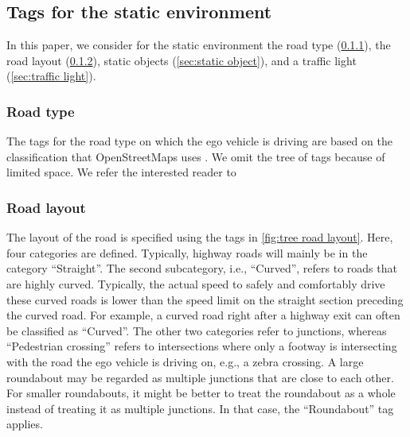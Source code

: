 \subsection{Tags for the static environment}
\label{sec:tags selection static}

In this paper, we consider for the static environment the road type (\cref{sec:road type}), the road layout (\cref{sec:road layout}), static objects (\cref{sec:static object}), and a traffic light (\cref{sec:traffic light}).



\subsubsection{Road type}
\label{sec:road type}

The tags for the road type on which the ego vehicle is driving are based on the classification that OpenStreetMaps uses \autocite{HighwayKeyOSM}. We omit the tree of tags because of limited space. We refer the interested reader to \autocite{HighwayKeyOSM}

%



\subsubsection{Road layout}
\label{sec:road layout}

The layout of the road is specified using the tags in \cref{fig:tree road layout}. Here, four categories are defined. Typically, highway roads will mainly be in the category ``Straight''. The second subcategory, i.e., ``Curved'', refers to roads that are highly curved. Typically, the actual speed to safely and comfortably drive these curved roads is lower than the speed limit on the straight section preceding the curved road. For example, a curved road right after a highway exit can often be classified as ``Curved''. The other two categories refer to junctions, whereas ``Pedestrian crossing'' refers to intersections where only a footway is intersecting with the road the ego vehicle is driving on, e.g., a zebra crossing. A large roundabout may be regarded as multiple junctions that are close to each other. For smaller roundabouts, it might be better to treat the roundabout as a whole instead of treating it as multiple junctions. In that case, the ``Roundabout'' tag applies.

